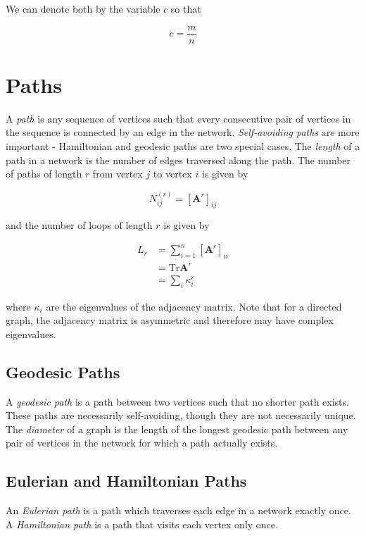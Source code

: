 \documentclass[12pt]{book}
\begin{document}
We can denote both by the variable $c$ so that

\begin{equation}
c=\frac{m}{n}
\end{equation}

\section{Paths}
A \textit{path} is any sequence of vertices such that every consecutive pair of vertices in the sequence is connected by an edge in the network. \textit{Self-avoiding paths} are more important - Hamiltonian and geodesic paths are two special cases.  The \textit{length} of a path in a network is the number of edges traversed along the path.  The number of paths of length $r$ from vertex $j$ to vertex $i$ is given by

\begin{equation}
N_{ij}^{(r)} = \left[\mathbf{A}^r\right]_{ij}
\end{equation}

and the number of loops of length $r$ is given by

\begin{equation}
\begin{split}
L_r &= \sum_{i=1}^n \left[\mathbf{A}^r\right]_{ii} \\
    &= \mathrm{Tr}\mathbf{A}^r \\
    &= \sum_i \kappa_i^r
\end{split}
\end{equation}

where $\kappa_i$ are the eigenvalues of the adjacency matrix.  Note that for a directed graph, the adjacency matrix is asymmetric and therefore may have complex eigenvalues.

\subsection{Geodesic Paths}
A \textit{geodesic path} is a path between two vertices such that no shorter path exists.  These paths are necessarily self-avoiding, though they are not necessarily unique.  The \textit{diameter} of a graph is the length of the longest geodesic path between any pair of vertices in the network for which a path actually exists.

\subsection{Eulerian and Hamiltonian Paths}
An \textit{Eulerian path} is a path which traverses each edge in a network exactly once.  A \textit{Hamiltonian path} is a path that visits each vertex only once.
\end{document}
